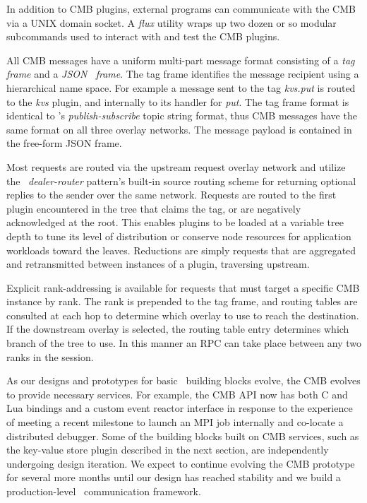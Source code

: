 In addition to CMB plugins, external programs can communicate with the CMB
via a UNIX domain socket.  A {\em flux} utility wraps up two dozen or so
modular subcommands used to interact with and test the CMB plugins.

All CMB messages have a uniform multi-part message format consisting of
a {\em tag frame} and a {\em JSON~\cite{rfc4627} frame}.  The tag frame identifies the
message recipient using a hierarchical name space.  For example a message
sent to the tag {\em kvs.put} is routed to the {\em kvs} plugin, and internally
to its handler for {\em put}.  The tag frame format is identical to
\zMQ's {\em publish-subscribe} topic string format, thus CMB messages
have the same format on all three overlay networks.
The message payload is contained in the free-form JSON frame.

Most requests are routed via the upstream request overlay network
and utilize the \zMQ\ {\em dealer-router} pattern's built-in source routing
scheme for returning optional replies to the sender over the same network.
Requests are routed to the first plugin encountered in the tree that claims
the tag, or are negatively acknowledged at the root.  This enables plugins
to be loaded at a variable tree depth to tune its level of distribution
or conserve node resources for application workloads toward the leaves.
Reductions are simply requests that are aggregated and retransmitted between
instances of a plugin, traversing upstream.

Explicit rank-addressing is available for requests that must target a
specific CMB instance by rank.  The rank is prepended to the tag frame,
and routing tables are consulted at each hop to determine which overlay
to use to reach the destination.  If the downstream overlay is selected,
the routing table entry determines which branch of the tree to use.
In this manner an RPC can take place between any two ranks in the session.

As our designs and prototypes for basic \flux\ building blocks evolve,
the CMB evolves to provide necessary services.  For example, the CMB API
now has both C and Lua bindings and a custom event reactor interface in
response to the experience of meeting a recent milestone to launch an
MPI job internally and co-locate a distributed debugger.  Some of the building
blocks built on CMB services, such as the key-value store plugin described
in the next section, are independently undergoing design iteration.
We expect to continue evolving the CMB prototype for several more months until
our design has reached stability and we build a production-level \flux\ 
communication framework.
